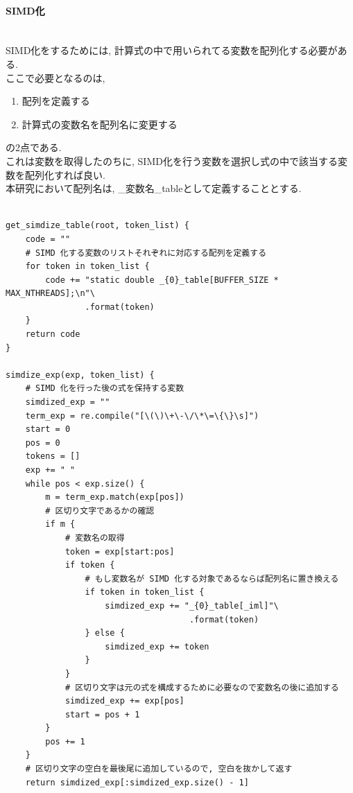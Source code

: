 \paragraph{SIMD化}~\\
SIMD化をするためには, 計算式の中で用いられてる変数を配列化する必要がある.\\
ここで必要となるのは,
\begin{enumerate}
\item 配列を定義する
\item 計算式の変数名を配列名に変更する
\end{enumerate}
の2点である.\\
これは変数を取得したのちに, SIMD化を行う変数を選択し式の中で該当する変数を配列化すれば良い.\\
本研究において配列名は, \_変数名\_tableとして定義することとする.\\
{\footnotesize
\begin{lstlisting}[caption=計算式内の変数の配列化,label=obtain-vars, frame=single]

get_simdize_table(root, token_list) {
    code = ""
    # SIMD 化する変数のリストそれぞれに対応する配列を定義する
    for token in token_list {
        code += "static double _{0}_table[BUFFER_SIZE * MAX_NTHREADS];\n"\
                .format(token)
    }
    return code
}

simdize_exp(exp, token_list) {
    # SIMD 化を行った後の式を保持する変数
    simdized_exp = ""
    term_exp = re.compile("[\(\)\+\-\/\*\=\{\}\s]")
    start = 0
    pos = 0
    tokens = []
    exp += " "
    while pos < exp.size() {
        m = term_exp.match(exp[pos])
        # 区切り文字であるかの確認
        if m {
            # 変数名の取得
            token = exp[start:pos]
            if token {
                # もし変数名が SIMD 化する対象であるならば配列名に置き換える
                if token in token_list {
                    simdized_exp += "_{0}_table[_iml]"\
                                     .format(token)
                } else {
                    simdized_exp += token
                }
            }
            # 区切り文字は元の式を構成するために必要なので変数名の後に追加する
            simdized_exp += exp[pos]
            start = pos + 1
        }
        pos += 1
    }
    # 区切り文字の空白を最後尾に追加しているので, 空白を抜かして返す
    return simdized_exp[:simdized_exp.size() - 1]
\end{lstlisting}
}

